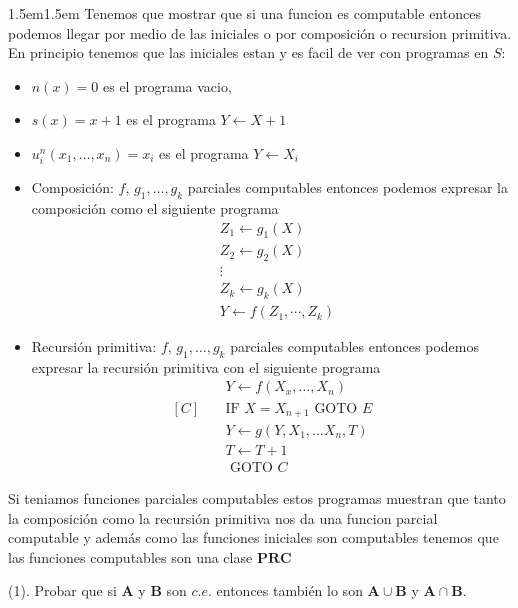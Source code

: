 \documentclass[leqno, 12pt, twoside,letterpaper]{book}
\theoremstyle{plain}
\theoremstyle{definition}
\newcommand{\ba}[0]{\bm{A}}
\newcommand{\PRC}[0]{\bm{PRC}}
\newcounter{excounter}
\newenvironment{solucion}[0]{\begin{adjustwidth}{1.5em}{1.5em}}{\end{adjustwidth}}
\newenvironment{ej}[1]{\noindent\stepcounter{excounter} \begin{exbox}\textbf{\arabic{excounter}} (#1).}{\end{exbox}}
\begin{document}
\begin{solucion}
Tenemos que mostrar que si una funcion es computable entonces podemos llegar por medio de las iniciales o por composición o recursion primitiva.
En principio tenemos que las iniciales estan  y es facil de ver con programas en $S$:

\begin{itemize}
\renewcommand\labelitemi{$\sim$}
\item $n(x) = 0$ es el programa vacio,
\item $s(x) = x + 1$ es el programa   $Y \leftarrow X + 1  $
\item $u_i^n(x_1, \dots, x_n) = x_i$ es el programa $Y \leftarrow X_i  $
\item Composición: $f$, $g_1, \dots, g_k$ parciales computables entonces podemos expresar la composición como el siguiente programa 
\begin{align*}
	 & Z_1 \leftarrow g_1(X) \\
	 & Z_2 \leftarrow g_2(X) \\
	 & \vdots \\
	 & Z_k \leftarrow g_k(X) \\
	 & Y \leftarrow f(Z_1, \cdots, Z_k)
\end{align*}
\item Recursión primitiva: $f$, $g_1, \dots, g_k$ parciales computables entonces podemos expresar la recursión primitiva con el siguiente programa 
\begin{align*}
	    	  & Y \leftarrow f(X_x, \dots, X_n) \\
	[C] \quad & \mbox{IF } X = X_{n+1} \mbox{ GOTO } E \\
			  & Y \leftarrow g(Y, X_1, \dots X_n, T) \\
			  & T \leftarrow T + 1 \\
			  & \mbox{ GOTO } C 
\end{align*}
\end{itemize}

\noindent Si teniamos funciones parciales computables estos programas muestran que tanto la composición como la recursión primitiva nos da una funcion parcial computable y además como las funciones iniciales son computables tenemos que las funciones computables son una clase $\PRC$
\end{solucion}

\begin{ej}{1}
    Probar que si $\ba$ y $\bm{B}$ son $c.e.$ entonces también lo son $\ba \cup
    \bm{B}$ y $\ba \cap \bm{B}$.
\end{ej}
\end{document}
